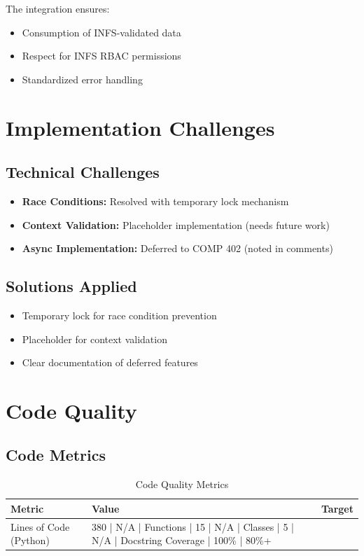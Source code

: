 The integration ensures:
\begin{itemize}
    \item Consumption of INFS-validated data
    \item Respect for INFS RBAC permissions
    \item Standardized error handling
\end{itemize}

\section{Implementation Challenges}

\subsection{Technical Challenges}

\begin{itemize}
    \item \textbf{Race Conditions:} Resolved with temporary lock mechanism
    \item \textbf{Context Validation:} Placeholder implementation (needs future work)
    \item \textbf{Async Implementation:} Deferred to COMP 402 (noted in comments)
\end{itemize}

\subsection{Solutions Applied}

\begin{itemize}
    \item Temporary lock for race condition prevention
    \item Placeholder for context validation
    \item Clear documentation of deferred features
\end{itemize}

\section{Code Quality}

\subsection{Code Metrics}

\begin{table}[H]
\centering
\begin{tabular}{|l|l|l|}
\hline
\textbf{Metric} & \textbf{Value} & \textbf{Target} \\
\hline
Lines of Code (Python) & 380 | N/A |
Functions | 15 | N/A |
Classes | 5 | N/A |
Docstring Coverage | 100\% | 80\%+ \\
\end{tabular}
\caption{Code Quality Metrics}
\end{table}


